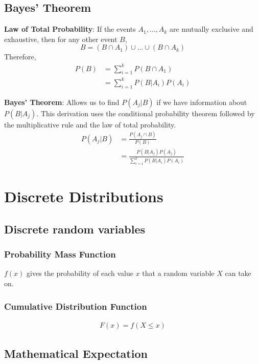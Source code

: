 \documentclass{article}
\begin{document}
\begin{multicols*}{2}
\subsection{Bayes' Theorem}

\textbf{Law of Total Probability}: If the events $A_1, \ldots, A_k$ are mutually exclusive and exhaustive, then for any other event $B$,
\begin{equation*}
    B = (B \cap A_1) \cup \ldots \cup (B \cap A_k)
\end{equation*}
Therefore,
\begin{align*}
    P(B) &= \sum_{i = 1}^k P(B \cap A_1) \\
    &= \sum_{i = 1}^k P(B|A_i) P(A_i)
\end{align*}

\textbf{Bayes' Theorem}:
Allows us to find $P(A_j|B)$ if we have information about $P(B|A_j)$. This derivation uses the conditional probability theorem followed by the multiplicative rule and the law of total probability.
\begin{align*}
    P(A_j|B) &= \frac{P(A_j \cap B)}{P(B)} \\
    &= \frac{P(B|A_j) P(A_j)}{\sum_{i = 1}^k P(B|A_i) P(A_i)}
\end{align*}

\section{Discrete Distributions}

\subsection{Discrete random variables}

\subsubsection{Probability Mass Function}
$f(x)$ gives the probability of each value $x$ that a random variable $X$ can take on.

\subsubsection{Cumulative Distribution Function}
\begin{align*}
    F(x) = f(X \leq x)
\end{align*}

\subsection{Mathematical Expectation}


\end{multicols*}
\end{document}
